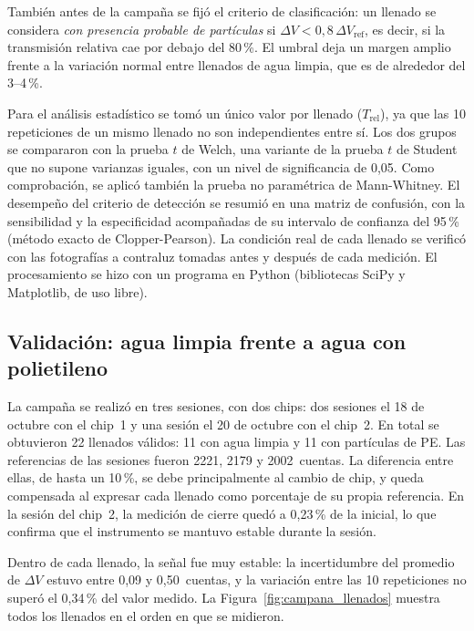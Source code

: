 También antes de la campaña se fijó el criterio de clasificación: un llenado se
considera \emph{con presencia probable de partículas} si
$\Delta V < 0{,}8\,\Delta V_{\mathrm{ref}}$, es decir, si la transmisión relativa cae
por debajo del 80\,\%. El umbral deja un margen amplio frente a la variación normal
entre llenados de agua limpia, que es de alrededor del 3--4\,\%.

Para el análisis estadístico se tomó un único valor por llenado ($T_{\mathrm{rel}}$),
ya que las 10 repeticiones de un mismo llenado no son independientes entre sí. Los
dos grupos se compararon con la prueba $t$ de Welch, una variante de la prueba
$t$ de Student que no supone varianzas iguales, con un nivel de significancia de
0,05. Como comprobación, se aplicó también la prueba no paramétrica de Mann-Whitney.
El desempeño del criterio de detección se resumió en una matriz de confusión, con la
sensibilidad y la especificidad acompañadas de su intervalo de confianza del 95\,\%
(método exacto de Clopper-Pearson). La condición real de cada llenado se verificó con
las fotografías a contraluz tomadas antes y después de cada medición. El
procesamiento se hizo con un programa en Python (bibliotecas SciPy y Matplotlib, de
uso libre).



\subsection{Validación: agua limpia frente a agua con polietileno}

La campaña se realizó en tres sesiones, con dos chips: dos sesiones el 18 de
octubre con el chip~1 y una sesión el 20 de octubre con el chip~2. En total se
obtuvieron 22 llenados válidos: 11 con agua limpia y 11 con partículas de PE. Las
referencias de las sesiones fueron 2221, 2179 y 2002~cuentas. La diferencia entre
ellas, de hasta un 10\,\%, se debe principalmente al cambio de chip, y queda
compensada al expresar cada llenado como porcentaje de su propia referencia. En la sesión del chip~2, la
medición de cierre quedó a 0,23\,\% de la inicial, lo que confirma que el
instrumento se mantuvo estable durante la sesión.

Dentro de cada llenado, la señal fue muy estable: la incertidumbre del promedio de
$\Delta V$ estuvo entre 0,09 y 0,50~cuentas, y la variación entre las 10 repeticiones
no superó el 0,34\,\% del valor medido. La Figura~\ref{fig:campana_llenados} muestra
todos los llenados en el orden en que se midieron.

